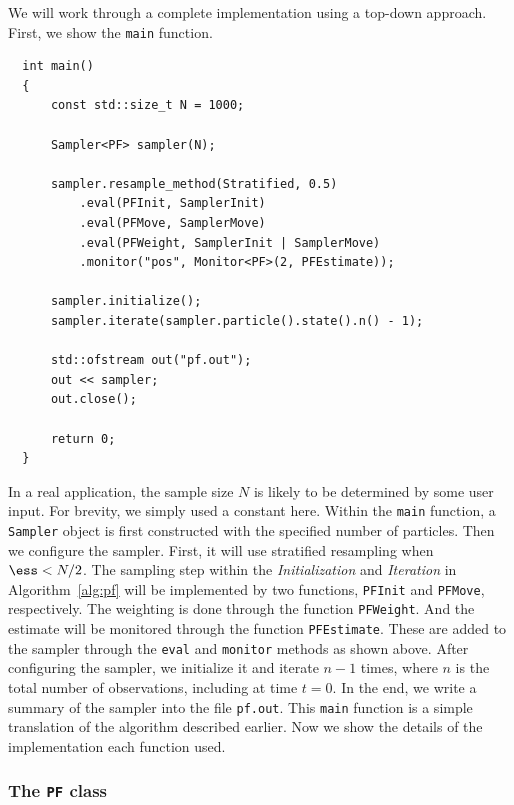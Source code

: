 We will work through a complete implementation using a top-down approach.
First, we show the \verb|main| function.
\begin{Verbatim}
  int main()
  {
      const std::size_t N = 1000;

      Sampler<PF> sampler(N);

      sampler.resample_method(Stratified, 0.5)
          .eval(PFInit, SamplerInit)
          .eval(PFMove, SamplerMove)
          .eval(PFWeight, SamplerInit | SamplerMove)
          .monitor("pos", Monitor<PF>(2, PFEstimate));

      sampler.initialize();
      sampler.iterate(sampler.particle().state().n() - 1);

      std::ofstream out("pf.out");
      out << sampler;
      out.close();

      return 0;
  }
\end{Verbatim}
In a real application, the sample size $N$ is likely to be determined by some
user input. For brevity, we simply used a constant here. Within the \verb|main|
function, a \verb|Sampler| object is first constructed with the specified
number of particles. Then we configure the sampler. First, it will use
stratified resampling when $\ess < N / 2$. The sampling step within the
\emph{Initialization} and \emph{Iteration} in Algorithm~\ref{alg:pf} will be
implemented by two functions, \verb|PFInit| and \verb|PFMove|, respectively.
The weighting is done through the function \verb|PFWeight|. And the estimate
will be monitored through the function \verb|PFEstimate|. These are added to
the sampler through the \verb|eval| and \verb|monitor| methods as shown above.
After configuring the sampler, we initialize it and iterate $n - 1$ times,
where $n$ is the total number of observations, including at time $t = 0$. In
the end, we write a summary of the sampler into the file \verb|pf.out|. This
\verb|main| function is a simple translation of the algorithm described
earlier. Now we show the details of the implementation each function used.

\subsubsection{The \texttt{PF} class}

